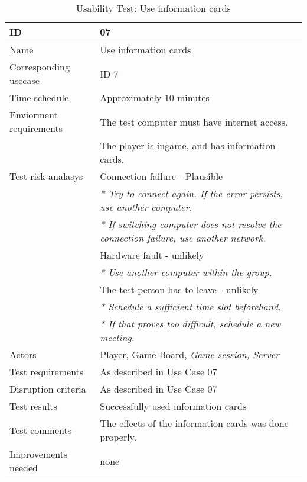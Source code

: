 {\footnotesize
\begin{table}[H]
\begin{tabular}{| p{5cm} | p{10cm} |}\hline
	\textbf{ID}	& \textbf{07} \\ \hline
	Name		& Use information cards\\ \hline
	Corresponding usecase & ID 7\\ \hline
	Time schedule	& Approximately 10 minutes\\ \hline
	Enviorment requirements 
		& The test computer must have internet access. \\ 
		& The player is ingame, and has information cards.\\ \hline
	Test risk analasys 
		& Connection failure - Plausible \\
		& \emph{* Try to connect again. If the error persists, use another computer.} \\
		& \emph{* If switching computer does not resolve the connection failure, use another network.}\\
		& Hardware fault - unlikely \\
		& \emph{* Use another computer within the group.} \\
		& The test person has to leave - unlikely \\
		& \emph{* Schedule a sufficient time slot beforehand.} \\
		& \emph{* If that proves too difficult, schedule a new meeting.}\\ \hline
	Actors	& Player, Game Board, \emph{Game session, Server}\\ \hline
	Test requirements & As described in Use Case 07 \\ \hline
	Disruption criteria & As described in Use Case 07  \\ \hline
	Test results & Successfully used information cards \\ \hline
	Test comments & The effects of the information cards was done properly. \\ \hline
	Improvements needed & none \\ \hline
\end{tabular}


\caption{Usability Test: Use information cards}
\label{fig:usability_test_7}
\end{table}}


